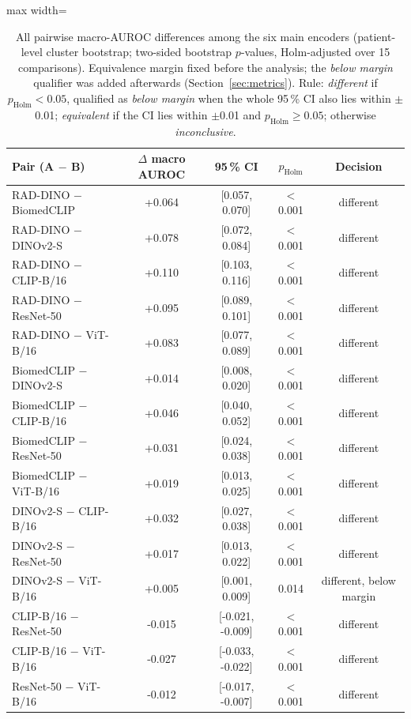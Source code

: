 \begin{table}[H]\centering
\scriptsize
\caption{All pairwise macro-AUROC differences among the six main encoders (patient-level cluster bootstrap; two-sided bootstrap $p$-values, Holm-adjusted over 15 comparisons). Equivalence margin fixed before the analysis; the \emph{below margin} qualifier was added afterwards (Section~\ref{sec:metrics}). Rule: \emph{different} if $p_{\mathrm{Holm}}<0.05$, qualified as \emph{below margin} when the whole 95\,\% CI also lies within $\pm$0.01; \emph{equivalent} if the CI lies within $\pm$0.01 and $p_{\mathrm{Holm}}\geq0.05$; otherwise \emph{inconclusive}.}\label{tab:pairwise}
\begin{adjustbox}{max width=\linewidth}
\begin{tabular}{lcccc}
\toprule
Pair (A $-$ B) & $\Delta$ macro AUROC & 95\,\% CI & $p_{\mathrm{Holm}}$ & Decision \\
\midrule
RAD-DINO $-$ BiomedCLIP & +0.064 & [0.057, 0.070] & $<$0.001 & different \\
RAD-DINO $-$ DINOv2-S & +0.078 & [0.072, 0.084] & $<$0.001 & different \\
RAD-DINO $-$ CLIP-B/16 & +0.110 & [0.103, 0.116] & $<$0.001 & different \\
RAD-DINO $-$ ResNet-50 & +0.095 & [0.089, 0.101] & $<$0.001 & different \\
RAD-DINO $-$ ViT-B/16 & +0.083 & [0.077, 0.089] & $<$0.001 & different \\
BiomedCLIP $-$ DINOv2-S & +0.014 & [0.008, 0.020] & $<$0.001 & different \\
BiomedCLIP $-$ CLIP-B/16 & +0.046 & [0.040, 0.052] & $<$0.001 & different \\
BiomedCLIP $-$ ResNet-50 & +0.031 & [0.024, 0.038] & $<$0.001 & different \\
BiomedCLIP $-$ ViT-B/16 & +0.019 & [0.013, 0.025] & $<$0.001 & different \\
DINOv2-S $-$ CLIP-B/16 & +0.032 & [0.027, 0.038] & $<$0.001 & different \\
DINOv2-S $-$ ResNet-50 & +0.017 & [0.013, 0.022] & $<$0.001 & different \\
DINOv2-S $-$ ViT-B/16 & +0.005 & [0.001, 0.009] & 0.014 & different, below margin \\
CLIP-B/16 $-$ ResNet-50 & -0.015 & [-0.021, -0.009] & $<$0.001 & different \\
CLIP-B/16 $-$ ViT-B/16 & -0.027 & [-0.033, -0.022] & $<$0.001 & different \\
ResNet-50 $-$ ViT-B/16 & -0.012 & [-0.017, -0.007] & $<$0.001 & different \\
\bottomrule
\end{tabular}
\end{adjustbox}
\end{table}
